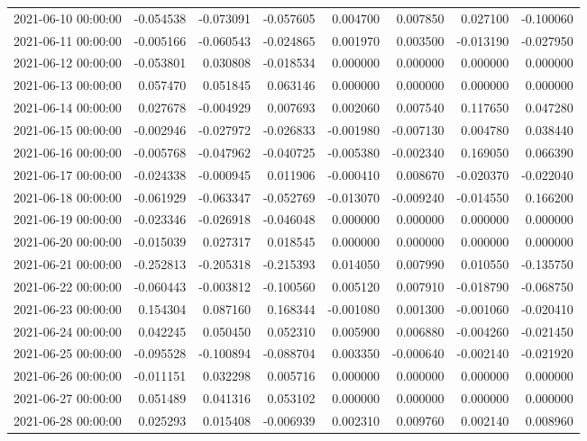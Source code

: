 \begin{tabular}{lrrrrrrr}
2021-06-10 00:00:00 & -0.054538 & -0.073091 & -0.057605 & 0.004700 & 0.007850 & 0.027100 & -0.100060 \\
2021-06-11 00:00:00 & -0.005166 & -0.060543 & -0.024865 & 0.001970 & 0.003500 & -0.013190 & -0.027950 \\
2021-06-12 00:00:00 & -0.053801 & 0.030808 & -0.018534 & 0.000000 & 0.000000 & 0.000000 & 0.000000 \\
2021-06-13 00:00:00 & 0.057470 & 0.051845 & 0.063146 & 0.000000 & 0.000000 & 0.000000 & 0.000000 \\
2021-06-14 00:00:00 & 0.027678 & -0.004929 & 0.007693 & 0.002060 & 0.007540 & 0.117650 & 0.047280 \\
2021-06-15 00:00:00 & -0.002946 & -0.027972 & -0.026833 & -0.001980 & -0.007130 & 0.004780 & 0.038440 \\
2021-06-16 00:00:00 & -0.005768 & -0.047962 & -0.040725 & -0.005380 & -0.002340 & 0.169050 & 0.066390 \\
2021-06-17 00:00:00 & -0.024338 & -0.000945 & 0.011906 & -0.000410 & 0.008670 & -0.020370 & -0.022040 \\
2021-06-18 00:00:00 & -0.061929 & -0.063347 & -0.052769 & -0.013070 & -0.009240 & -0.014550 & 0.166200 \\
2021-06-19 00:00:00 & -0.023346 & -0.026918 & -0.046048 & 0.000000 & 0.000000 & 0.000000 & 0.000000 \\
2021-06-20 00:00:00 & -0.015039 & 0.027317 & 0.018545 & 0.000000 & 0.000000 & 0.000000 & 0.000000 \\
2021-06-21 00:00:00 & -0.252813 & -0.205318 & -0.215393 & 0.014050 & 0.007990 & 0.010550 & -0.135750 \\
2021-06-22 00:00:00 & -0.060443 & -0.003812 & -0.100560 & 0.005120 & 0.007910 & -0.018790 & -0.068750 \\
2021-06-23 00:00:00 & 0.154304 & 0.087160 & 0.168344 & -0.001080 & 0.001300 & -0.001060 & -0.020410 \\
2021-06-24 00:00:00 & 0.042245 & 0.050450 & 0.052310 & 0.005900 & 0.006880 & -0.004260 & -0.021450 \\
2021-06-25 00:00:00 & -0.095528 & -0.100894 & -0.088704 & 0.003350 & -0.000640 & -0.002140 & -0.021920 \\
2021-06-26 00:00:00 & -0.011151 & 0.032298 & 0.005716 & 0.000000 & 0.000000 & 0.000000 & 0.000000 \\
2021-06-27 00:00:00 & 0.051489 & 0.041316 & 0.053102 & 0.000000 & 0.000000 & 0.000000 & 0.000000 \\
2021-06-28 00:00:00 & 0.025293 & 0.015408 & -0.006939 & 0.002310 & 0.009760 & 0.002140 & 0.008960 \\

\end{tabular}
